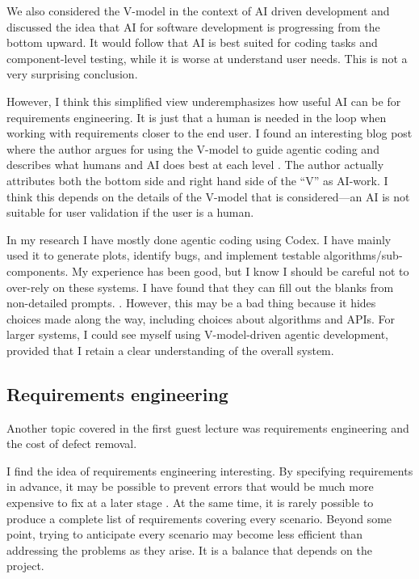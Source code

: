 \documentclass{article}
\begin{document}
We also considered the V-model in the context of AI driven development and discussed the idea that AI for software development is progressing from the bottom upward. 
It would follow that AI is best suited for coding tasks and component-level testing, while it is worse at understand user needs.
This is not a very surprising conclusion.

However, I think this simplified view underemphasizes how useful AI can be for requirements engineering. It is just that a human is needed in the loop when working with requirements closer to the end user.
I found an interesting blog post where the author argues for using the V-model to guide agentic coding and describes what humans and AI does best at each level \cite{kfir2026vmodel}. 
The author actually attributes both the bottom side and right hand side of the \enquote{V} as AI-work. 
I think this depends on the details of the V-model that is considered---an AI is not suitable for user validation if the user is a human. 

In my research I have mostly done agentic coding using Codex. I have mainly used it to generate plots, identify bugs, and implement testable algorithms/sub-components.
My experience has been good, but I know I should be careful not to over-rely on these systems. 
I have found that they can fill out the blanks from non-detailed prompts.
. However, this may be a bad thing because it hides choices made along the way, including choices about algorithms and APIs. For larger systems, I could see myself using V-model-driven agentic development, provided that I retain a clear understanding of the overall system.


\subsection{Requirements engineering}
Another topic covered in the first guest lecture was requirements engineering and the cost of defect removal.

I find the idea of requirements engineering interesting. By specifying requirements in advance, it may be possible to prevent errors that would be much more expensive to fix at a later stage \cite{boehm2001software}.
At the same time, it is rarely possible to produce a complete list of requirements covering every scenario. Beyond some point, trying to anticipate every scenario may become less efficient than addressing the problems as they arise. 
It is a balance that depends on the project.
\end{document}
